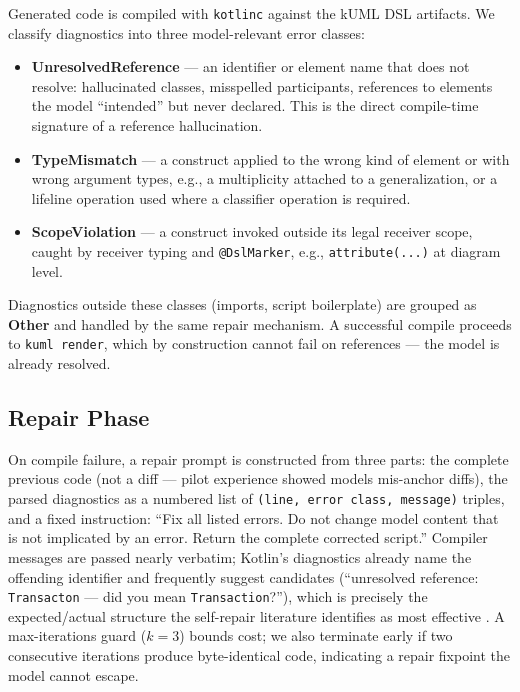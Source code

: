 \documentclass[acmsmall,nonacm]{acmart}
\begin{document}
Generated code is compiled with \texttt{kotlinc} against the kUML DSL artifacts. We classify diagnostics into three model-relevant error classes:

\begin{itemize}
  \item \textbf{UnresolvedReference} --- an identifier or element name that does not resolve: hallucinated classes, misspelled participants, references to elements the model ``intended'' but never declared. This is the direct compile-time signature of a reference hallucination.
  \item \textbf{TypeMismatch} --- a construct applied to the wrong kind of element or with wrong argument types, e.g., a multiplicity attached to a generalization, or a lifeline operation used where a classifier operation is required.
  \item \textbf{ScopeViolation} --- a construct invoked outside its legal receiver scope, caught by receiver typing and \texttt{@DslMarker}, e.g., \texttt{attribute(...)} at diagram level.
\end{itemize}

Diagnostics outside these classes (imports, script boilerplate) are grouped as \textbf{Other} and handled by the same repair mechanism. A successful compile proceeds to \texttt{kuml render}, which by construction cannot fail on references --- the model is already resolved.

\subsection{Repair Phase}

On compile failure, a repair prompt is constructed from three parts: the complete previous code (not a diff --- pilot experience showed models mis-anchor diffs), the parsed diagnostics as a numbered list of \texttt{(line, error class, message)} triples, and a fixed instruction: ``Fix all listed errors. Do not change model content that is not implicated by an error. Return the complete corrected script.'' Compiler messages are passed nearly verbatim; Kotlin's diagnostics already name the offending identifier and frequently suggest candidates (``unresolved reference: \texttt{Transacton} --- did you mean \texttt{Transaction}?''), which is precisely the expected/actual structure the self-repair literature identifies as most effective \citep{chen2023}. A max-iterations guard ($k = 3$) bounds cost; we also terminate early if two consecutive iterations produce byte-identical code, indicating a repair fixpoint the model cannot escape.
\end{document}
